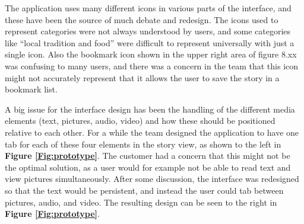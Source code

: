 The application uses many different icons in various parts of the interface, and these have been the source of much debate and redesign. The icons used to represent categories were not always understood by users, and some categories like “local tradition and food” were difficult to represent universally with just a single icon. Also the bookmark icon shown in the upper right area of figure 8.xx was confusing to many users, and there was a concern in the team that this icon might not accurately represent that it allows the user to save the story in a bookmark list.\newline

A big issue for the interface design has been the handling of the different media elements (text, pictures, audio, video) and how these should be positioned relative to each other. For a while the team designed the application to have one tab for each of these four elements in the story view, as shown to the left in \textbf{Figure \ref{Fig:prototype}}. The customer had a concern that this might not be the optimal solution, as a user would for example not be able to read text and view pictures simultaneously. After some discussion, the interface was redesigned so that the text would be persistent, and instead the user could tab between pictures, audio, and video. The resulting design can be seen to the right in \textbf{Figure \ref{Fig:prototype}}. \newline


